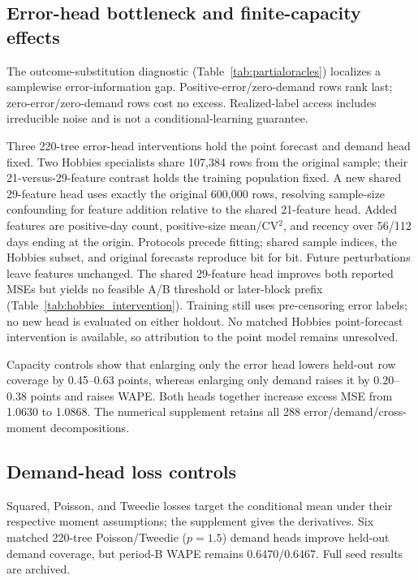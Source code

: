 \subsection{Error-head bottleneck and finite-capacity effects}

The outcome-substitution diagnostic (Table~\ref{tab:partialoracles}) localizes a samplewise error-information gap. Positive-error/zero-demand rows rank last; zero-error/zero-demand rows cost no excess. Realized-label access includes irreducible noise and is not a conditional-learning guarantee.

Three 220-tree error-head interventions hold the point forecast and demand head fixed. Two Hobbies specialists share 107,384 rows from the original sample; their 21-versus-29-feature contrast holds the training population fixed. A new shared 29-feature head uses exactly the original 600,000 rows, resolving sample-size confounding for feature addition relative to the shared 21-feature head. Added features are positive-day count, positive-size mean/CV$^2$, and recency over 56/112 days ending at the origin. Protocols precede fitting; shared sample indices, the Hobbies subset, and original forecasts reproduce bit for bit. Future perturbations leave features unchanged. The shared 29-feature head improves both reported MSEs but yields no feasible A/B threshold or later-block prefix (Table~\ref{tab:hobbies_intervention}). Training still uses pre-censoring error labels; no new head is evaluated on either holdout. No matched Hobbies point-forecast intervention is available, so attribution to the point model remains unresolved.

Capacity controls show that enlarging only the error head lowers held-out row coverage by 0.45--0.63 points, whereas enlarging only demand raises it by 0.20--0.38 points and raises WAPE. Both heads together increase excess MSE from 1.0630 to 1.0868. The numerical supplement retains all 288 error/demand/cross-moment decompositions.

\subsection{Demand-head loss controls}
Squared, Poisson, and Tweedie losses target the conditional mean under their respective moment assumptions; the supplement gives the derivatives. Six matched 220-tree Poisson/Tweedie ($p=1.5$) demand heads improve held-out demand coverage, but period-B WAPE remains 0.6470/0.6467. Full seed results are archived.

